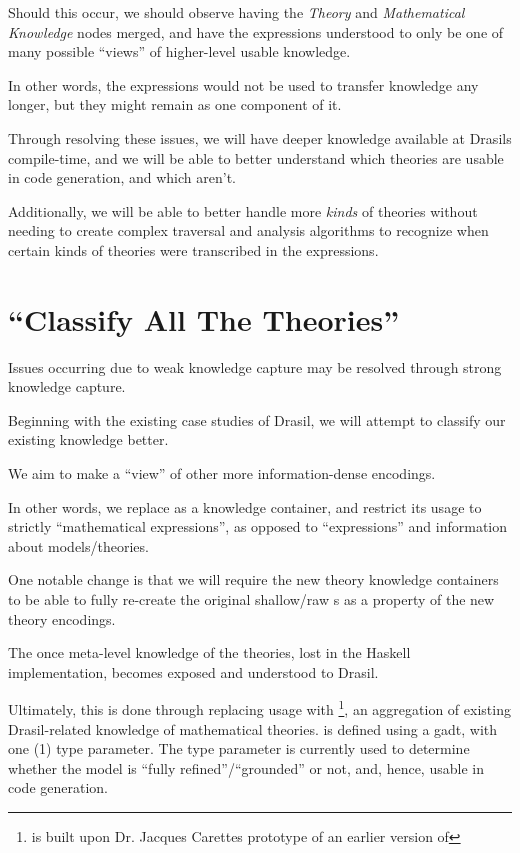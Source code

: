 Should this occur, we should observe  having the
\textit{Theory} and \textit{Mathematical Knowledge} nodes merged, and have the
expressions understood to only be one of many possible ``views'' of higher-level
usable knowledge.

In other words, the expressions would not be used to transfer knowledge any
longer, but they might remain as one component of it.

Through resolving these issues, we will have deeper knowledge available at
Drasils compile-time, and we will be able to better understand which theories
are usable in code generation, and which aren't.

Additionally, we will be able to better handle more \textit{kinds} of theories
without needing to create complex traversal and analysis algorithms to recognize
when certain kinds of theories were transcribed in the expressions.




\section{\textquotedblleft{}Classify All The Theories\textquotedblright{}}

Issues occurring due to weak knowledge capture may be resolved through strong
knowledge capture.

Beginning with the existing case studies of Drasil, we will attempt to classify
our existing knowledge better.

We aim to make \RelationConcept{} a ``view'' of other more information-dense
encodings.

In other words, we replace \Expr{} as a knowledge container, and restrict its
usage to strictly ``mathematical expressions'', as opposed to ``expressions''
and information about models/theories.

One notable change is that we will require the new theory knowledge containers
to be able to fully re-create the original shallow/raw \Expr{}s as a property of
the new theory encodings.

The once meta-level knowledge of the theories, lost in the Haskell
implementation, becomes exposed and understood to Drasil.

Ultimately, this is done through replacing \RelationConcept{} usage with
\ModelKind{}\footnote{\ModelKind{} is built upon Dr. Jacques Carettes prototype
of an earlier version of \ModelKinds{}}, an aggregation of existing
Drasil-related knowledge of mathematical theories. \ModelKind{} is defined using
a \acs{gadt}, with one (1) type parameter. The type parameter is currently used
to determine whether the model is ``fully refined''/``grounded'' or not, and,
hence, usable in code generation.

